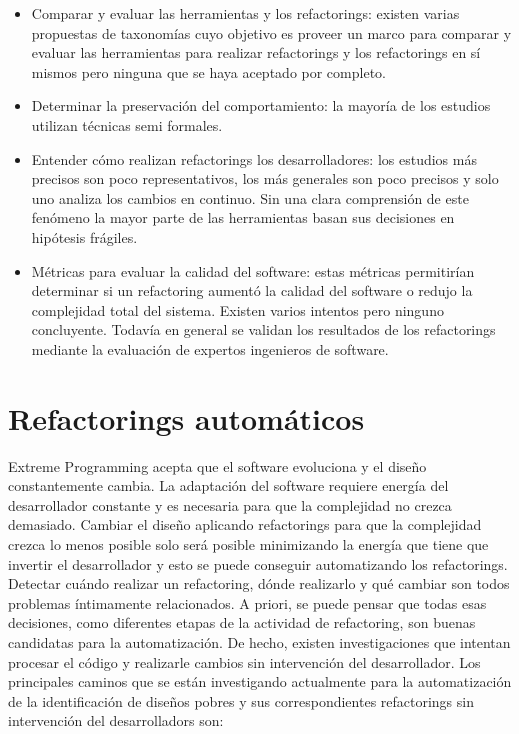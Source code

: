 \begin{itemize}
    \item Comparar y evaluar las herramientas y los refactorings: existen varias propuestas de taxonomías cuyo
    objetivo es proveer un marco para comparar y evaluar las herramientas para realizar refactorings y los
    refactorings en sí mismos pero ninguna que se haya aceptado por completo.
    \item Determinar la preservación del comportamiento: la mayoría de los estudios utilizan
    técnicas semi formales.
    \item Entender cómo realizan refactorings los desarrolladores: los estudios más precisos son
    poco representativos, los más generales son poco precisos y solo uno analiza los cambios en
    continuo. Sin una clara comprensión de este fenómeno la mayor parte de las herramientas basan
    sus decisiones en hipótesis frágiles.
    \item Métricas para evaluar la calidad del software: estas métricas permitirían determinar si un
    refactoring aumentó la calidad del software o redujo la complejidad total del sistema. Existen 
    varios intentos pero ninguno concluyente. Todavía en general se validan los resultados de los
    refactorings mediante la evaluación de expertos ingenieros de software.
\end{itemize}


\section{Refactorings automáticos}
Extreme Programming acepta que el software evoluciona y el diseño constantemente cambia. La
adaptación del software requiere energía del desarrollador constante y es necesaria para que la
complejidad no crezca demasiado. Cambiar el diseño aplicando refactorings para que la complejidad
crezca lo menos posible solo será posible minimizando la energía que tiene que invertir el
desarrollador y esto se puede conseguir automatizando los refactorings.
Detectar cuándo realizar un refactoring, dónde realizarlo y qué cambiar son todos problemas
íntimamente relacionados. A priori, se puede pensar que todas esas decisiones, como diferentes
etapas de la actividad de refactoring, son buenas candidatas para la automatización. De hecho,
existen investigaciones que intentan procesar el código y realizarle cambios sin intervención del
desarrollador. 
Los principales caminos que se están investigando actualmente para la automatización de la
identificación de diseños pobres y sus correspondientes refactorings sin intervención del
desarrolladors son:

